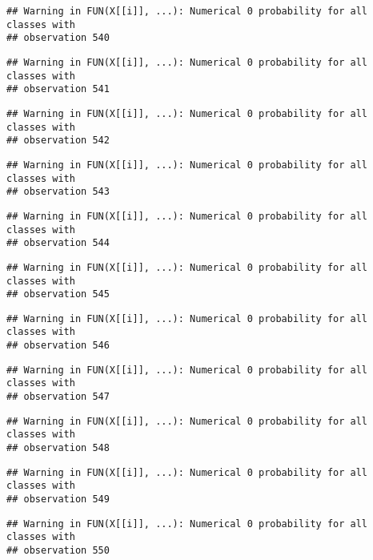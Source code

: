 \documentclass[
]{article}
\begin{document}
\begin{verbatim}
## Warning in FUN(X[[i]], ...): Numerical 0 probability for all classes with
## observation 540
\end{verbatim}

\begin{verbatim}
## Warning in FUN(X[[i]], ...): Numerical 0 probability for all classes with
## observation 541
\end{verbatim}

\begin{verbatim}
## Warning in FUN(X[[i]], ...): Numerical 0 probability for all classes with
## observation 542
\end{verbatim}

\begin{verbatim}
## Warning in FUN(X[[i]], ...): Numerical 0 probability for all classes with
## observation 543
\end{verbatim}

\begin{verbatim}
## Warning in FUN(X[[i]], ...): Numerical 0 probability for all classes with
## observation 544
\end{verbatim}

\begin{verbatim}
## Warning in FUN(X[[i]], ...): Numerical 0 probability for all classes with
## observation 545
\end{verbatim}

\begin{verbatim}
## Warning in FUN(X[[i]], ...): Numerical 0 probability for all classes with
## observation 546
\end{verbatim}

\begin{verbatim}
## Warning in FUN(X[[i]], ...): Numerical 0 probability for all classes with
## observation 547
\end{verbatim}

\begin{verbatim}
## Warning in FUN(X[[i]], ...): Numerical 0 probability for all classes with
## observation 548
\end{verbatim}

\begin{verbatim}
## Warning in FUN(X[[i]], ...): Numerical 0 probability for all classes with
## observation 549
\end{verbatim}

\begin{verbatim}
## Warning in FUN(X[[i]], ...): Numerical 0 probability for all classes with
## observation 550
\end{verbatim}
\end{document}
